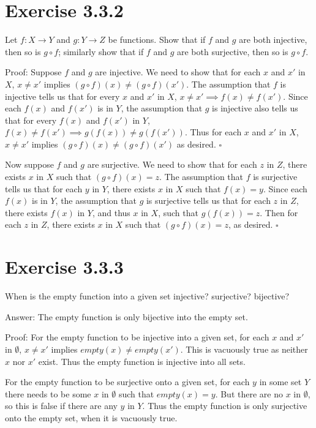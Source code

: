 \documentclass{assignment}
\date{April 26 2023}
\newenvironment{q}
    {\begin{bfseries}}
    {\end{bfseries}}
\begin{document}
\section*{Exercise 3.3.2}

\begin{q}
Let $f : X \to Y$ and $g : Y \to Z$ be functions. Show that if $f$ and $g$ are both injective, then so is $g \circ f$; similarly show that if $f$ and $g$ are both surjective, then so is $g \circ f$.
\end{q}

Proof: 
Suppose $f$ and $g$ are injective.
We need to show that for each $x$ and $x'$ in $X$, $x \neq x'$ implies $(g \circ f)(x) \neq (g \circ f)(x')$.
The assumption that $f$ is injective tells us that for every $x$ and $x'$ in $X$, $x \neq x' \implies f(x) \neq f(x')$.
Since each $f(x)$ and $f(x')$ is in $Y$, the assumption that $g$ is injective also tells us that for every $f(x)$ and $f(x')$ in $Y$, $f(x) \neq f(x') \implies g(f(x)) \neq g(f(x'))$.
Thus for each $x$ and $x'$ in $X$, $x \neq x'$ implies $(g \circ f)(x) \neq (g \circ f)(x')$ as desired. $\square$

Now suppose $f$ and $g$ are surjective.
We need to show that for each $z$ in $Z$, there exists $x$ in $X$ such that $(g \circ f)(x)=z$.
The assumption that $f$ is surjective tells us that for each $y$ in $Y$, there exists $x$ in $X$ such that $f(x)=y$.
Since each $f(x)$ is in $Y$, the assumption that $g$ is surjective tells us that for each $z$ in $Z$, there exists $f(x)$ in $Y$, and thus $x$ in $X$, such that $g(f(x))=z$. Then for each $z$ in $Z$, there exists $x$ in $X$ such that $(g \circ f)(x)=z$, as desired. $\square$ 

\section*{Exercise 3.3.3}
\begin{q}
    When is the empty function into a given set injective? surjective? bijective?
\end{q}

Answer: The empty function is only bijective into the empty set.

Proof: 
For the empty function to be injective into a given set, for each $x$ and $x'$ in $\emptyset$, $x \neq x'$ implies $empty(x) \neq empty(x')$. 
This is vacuously true as neither $x$ nor $x'$ exist. 
Thus the empty function is injective into all sets.

For the empty function to be surjective onto a given set, for each $y$ in some set $Y$ there needs to be some $x$ in $\emptyset$ such that $empty(x)=y$. 
But there are no $x$ in $\emptyset$, so this is false if there are any $y$ in $Y$. 
Thus the empty function is only surjective onto the empty set, when it is vacuously true. 
\end{document}
